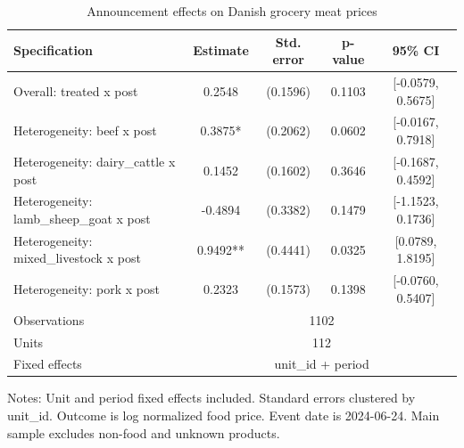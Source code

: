 \begin{table}[htbp]
\centering
\caption{Announcement effects on Danish grocery meat prices}
\begin{tabular}{lcccc}
\hline
Specification & Estimate & Std. error & p-value & 95\% CI \\
\hline
Overall: treated x post & 0.2548 & (0.1596) & 0.1103 & [-0.0579, 0.5675] \\
Heterogeneity: beef x post & 0.3875* & (0.2062) & 0.0602 & [-0.0167, 0.7918] \\
Heterogeneity: dairy_cattle x post & 0.1452 & (0.1602) & 0.3646 & [-0.1687, 0.4592] \\
Heterogeneity: lamb_sheep_goat x post & -0.4894 & (0.3382) & 0.1479 & [-1.1523, 0.1736] \\
Heterogeneity: mixed_livestock x post & 0.9492** & (0.4441) & 0.0325 & [0.0789, 1.8195] \\
Heterogeneity: pork x post & 0.2323 & (0.1573) & 0.1398 & [-0.0760, 0.5407] \\
\hline
Observations & \multicolumn{4}{c}{1102} \\
Units & \multicolumn{4}{c}{112} \\
Fixed effects & \multicolumn{4}{c}{unit_id + period} \\
\hline
\end{tabular}
\begin{minipage}{0.9\linewidth}\footnotesize Notes: Unit and period fixed effects included. Standard errors clustered by unit_id. Outcome is log normalized food price. Event date is 2024-06-24. Main sample excludes non-food and unknown products.\end{minipage}
\end{table}